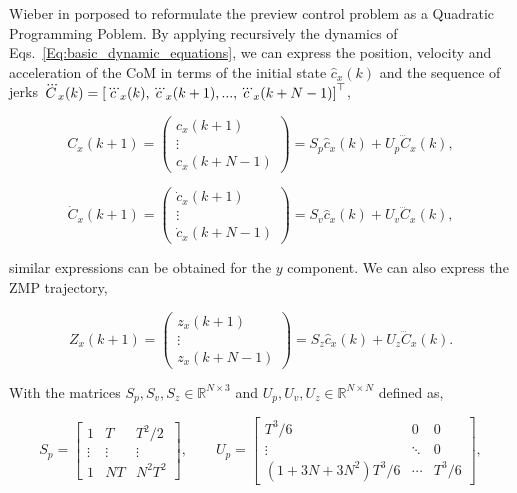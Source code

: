Wieber in \citep{WieberHumanoids2006} porposed to reformulate the preview control problem as a Quadratic Programming Poblem. By applying recursively the dynamics of Eqs.~\ref{Eq:basic_dynamic_equations}, we can express the position, velocity and acceleration  of the CoM in terms of the initial state $\hat{c}_x(k)$ and the sequence of jerks $\dddot{ C}_x(k) = \left[ \dddot{c}_x(k), \dddot{c}_x(k+1),...,\dddot{c}_x(k+N-1) \right]^{\top}$,

\begin{equation}
 \label{Eq:PosCMHorizon}
 {C}_x(k+1) = \left(
 \begin{matrix}
  c_x(k+1) \\
  \vdots \\
  c_x(k+N-1)
 \end{matrix}
 \right) = {S}_p \hat{c}_x(k) + { U}_p \dddot{C}_x(k),
\end{equation}

\begin{equation}
 \label{Eq:VelCMHorizon}
 \dot{C}_x(k+1) = \left(
 \begin{matrix}
  \dot{c}_x(k+1) \\
  \vdots \\
  \dot{c}_x(k+N-1)
 \end{matrix}
 \right) = {S}_v \hat{c}_x(k) + { U}_v \dddot{ C}_x(k),
\end{equation}

similar expressions can be obtained for the $y$ component. We can also express the ZMP trajectory,

\begin{equation}
 \label{Eq:PosZMPHorizon}
 { Z}_x(k+1) = \left(
 \begin{matrix}
  {z}_x(k+1) \\
  \vdots \\
  {z}_x(k+N-1)
 \end{matrix}
 \right) = { S}_z \hat{c}_x(k) + { U}_z \dddot{ C}_x(k).
\end{equation} 

With the matrices $S_p, S_v, S_z \in \mathbb{R}^{N\times3}$ and $U_p, U_v , U_z \in \mathbb{R}^{N \times N}$ defined as,

\begin{equation*}
  S_{p}=\begin{bmatrix} 1 & T & T^2/2 \\ \vdots & \vdots & \vdots \\ 1 & NT & N^2T^2 \end{bmatrix}, \qquad
  U_{p}=\begin{bmatrix} T^3/6 & 0 & 0 \\ \vdots & \ddots & 0 \\ (1+3N+3N^2)T^3/6 & \cdots & T^3/6 \end{bmatrix},
\end{equation*}

